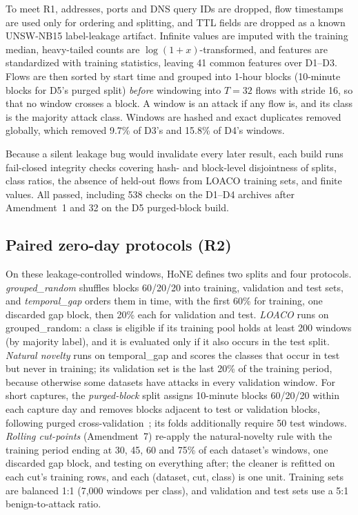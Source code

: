 \documentclass[conference]{IEEEtran}
\begin{document}
To meet R1, addresses, ports and DNS query IDs are dropped, flow timestamps are used only for ordering and splitting, and TTL fields are dropped as a known UNSW-NB15 label-leakage artifact. Infinite values are imputed with the training median, heavy-tailed counts are $\log(1{+}x)$-transformed, and features are standardized with training statistics, leaving 41 common features over D1--D3. Flows are then sorted by start time and grouped into 1-hour blocks (10-minute blocks for D5's purged split) \emph{before} windowing into $T{=}32$ flows with stride 16, so that no window crosses a block. A window is an attack if any flow is, and its class is the majority attack class. Windows are hashed and exact duplicates removed globally, which removed 9.7\% of D3's and 15.8\% of D4's windows.

Because a silent leakage bug would invalidate every later result, each build runs fail-closed integrity checks covering hash- and block-level disjointness of splits, class ratios, the absence of held-out flows from LOACO training sets, and finite values. All passed, including 538 checks on the D1--D4 archives after Amendment~1 and 32 on the D5 purged-block build.

\subsection{Paired zero-day protocols (R2)}
\label{sec:protocols}
On these leakage-controlled windows, HoNE defines two splits and four protocols. \emph{grouped\_random} shuffles blocks 60/20/20 into training, validation and test sets, and \emph{temporal\_gap} orders them in time, with the first 60\% for training, one discarded gap block, then 20\% each for validation and test. \emph{LOACO} runs on grouped\_random: a class is eligible if its training pool holds at least 200 windows (by majority label), and it is evaluated only if it also occurs in the test split. \emph{Natural novelty} runs on temporal\_gap and scores the classes that occur in test but never in training; its validation set is the last 20\% of the training period, because otherwise some datasets have attacks in every validation window. For short captures, the \emph{purged-block} split assigns 10-minute blocks 60/20/20 within each capture day and removes blocks adjacent to test or validation blocks, following purged cross-validation~\cite{lopezdeprado2018}; its folds additionally require 50 test windows. \emph{Rolling cut-points} (Amendment~7) re-apply the natural-novelty rule with the training period ending at 30, 45, 60 and 75\% of each dataset's windows, one discarded gap block, and testing on everything after; the cleaner is refitted on each cut's training rows, and each (dataset, cut, class) is one unit. Training sets are balanced 1:1 (7,000 windows per class), and validation and test sets use a 5:1 benign-to-attack ratio.
\end{document}
